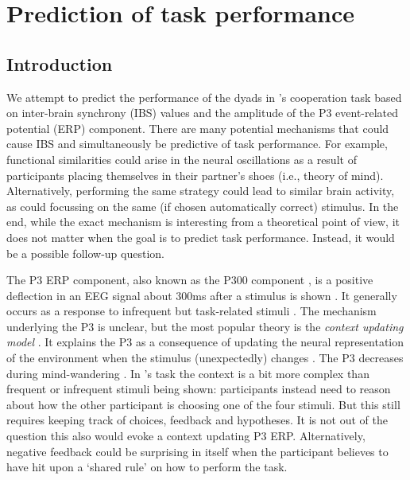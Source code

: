 
\section{Prediction of task performance}

\subsection{Introduction}

We attempt to predict the performance of the dyads in
\textcite{newman_effects_2021}'s cooperation task based on inter-brain synchrony
(IBS) values and the amplitude of the P3 event-related potential (ERP)
component. There are many potential mechanisms that could cause IBS and
simultaneously be predictive of task performance. For example, functional
similarities could arise in the neural oscillations as a result of participants
placing themselves in their partner's shoes (i.e., theory of mind).
Alternatively, performing the same strategy could lead to similar brain
activity, as could focussing on the same (if chosen automatically correct)
stimulus. In the end, while the exact mechanism is interesting from a
theoretical point of view, it does not matter when the goal is to predict task
performance. Instead, it would be a possible follow-up question.

The P3 ERP component, also known as the P300 component
\parencite[p.~5]{luck_introduction_2014}, is a positive deflection in an EEG
signal about 300ms after a stimulus is shown
\parencite{sutton_evoked-potential_1965}. It generally occurs as a response to
infrequent but task-related stimuli \parencite{polich_neuropsychology_2011}.
The mechanism underlying the P3 is unclear, but the most popular theory is the
\textit{context updating model} \parencite[p.~96]{luck_introduction_2014}. It
explains the P3 as a consequence of updating the neural representation of the
environment when the stimulus (unexpectedly) changes
\parencite{polich_neuropsychology_2011}. The P3 decreases during mind-wandering
\parencite{jin_predicting_2019}. In \textcite{newman_effects_2021}'s
task the context is a bit more complex than frequent or infrequent stimuli being
shown: participants instead need to reason about how the other participant is
choosing one of the four stimuli. But this still requires keeping track of
choices, feedback and hypotheses. It is not out of the question this also
would evoke a context updating P3 ERP. Alternatively, negative feedback could be
surprising in itself when the participant believes to have hit upon a `shared
rule' on how to perform the task.

